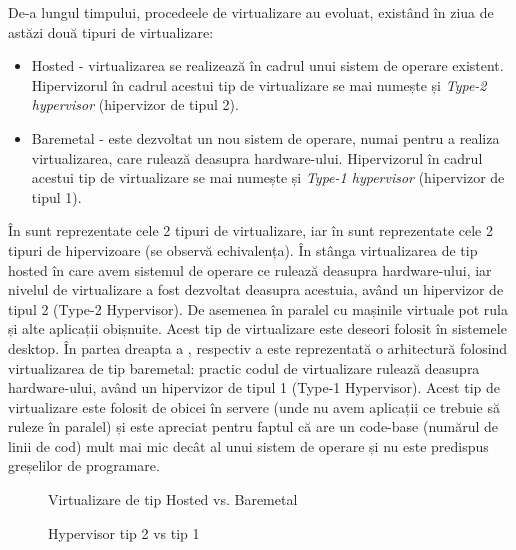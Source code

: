 De-a lungul timpului, procedeele de virtualizare au evoluat, existând în ziua de
astăzi două tipuri de virtualizare:

\begin{itemize}
	\item Hosted - virtualizarea se realizează în cadrul unui sistem de
		operare existent. Hipervizorul în cadrul acestui tip de
		virtualizare se mai numește și \textit{Type-2 hypervisor}
		(hipervizor de tipul 2).
	\item Baremetal - este dezvoltat un nou sistem de operare, numai pentru
		a realiza virtualizarea, care rulează deasupra hardware-ului.
		Hipervizorul în cadrul acestui tip de virtualizare se mai
		numește și \textit{Type-1 hypervisor} (hipervizor de tipul 1).
\end{itemize}

În  sunt reprezentate cele 2 tipuri
de virtualizare, iar în  sunt
reprezentate cele 2 tipuri de hipervizoare (se observă echivalența). În stânga
virtualizarea de tip hosted în care avem sistemul de operare ce rulează deasupra
hardware-ului, iar nivelul de virtualizare a fost dezvoltat deasupra acestuia,
având un hipervizor de tipul 2 (Type-2 Hypervisor). De asemenea în paralel cu
mașinile virtuale pot rula și alte aplicații obișnuite. Acest tip de
virtualizare este deseori folosit în sistemele desktop. În partea dreapta a
, respectiv a
 este reprezentată o arhitectură
folosind virtualizarea de tip baremetal: practic codul de virtualizare rulează
deasupra hardware-ului, având un hipervizor de tipul 1 (Type-1 Hypervisor).
Acest tip de virtualizare este folosit de obicei în servere (unde nu avem
aplicații ce trebuie să ruleze în paralel) și este apreciat pentru faptul că are
un code-base (numărul de linii de cod) mult mai mic decât al unui sistem de
operare și nu este predispus greșelilor de programare.

\begin{figure}[htbp]
	\centering
	\def\svgwidth{\columnwidth}
	
	\caption{Virtualizare de tip Hosted vs. Baremetal}
	\label{fig:vm-hostbaremetal}
\end{figure}

\begin{figure}[htbp]
	\centering
	\def\svgwidth{\columnwidth}
	
	\caption{Hypervisor tip 2 vs tip 1}
	\label{fig:vm-hypervisortypes}
\end{figure}

